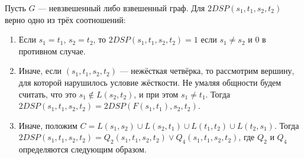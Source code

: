 \begin{theorem} \label{main_theorem}
Пусть $G$ --- невзвешенный либо взвешенный граф. Для $2DSP(s_1, t_1, s_2, t_2)$ верно одно из трёх соотношений:
\begin{enumerate} 
\item Если $s_1 = t_1$, $s_2 = t_2$, то $2DSP(s_1, t_1, s_2, t_2) = 1$ если $s_1 \neq s_2$ и $0$ в противном случае.
\item Иначе, если $(s_1, t_1, s_2, t_2)$ --- нежёсткая четвёрка, то рассмотрим вершину, для которой нарушилось условие жёсткости. Не умаляя общности будем считать, что это $s_1 \notin L(s_2, t_2)$, и при этом $s_1 \neq t_1$. Тогда $2DSP(s_1, t_1, s_2, t_2) = 2DSP(F(s_1, t_1), s_2, t_2)$.
\item Иначе, положим $C = L(s_1, s_2) \cup L(s_2, t_1) \cup L(t_1, t_2) \cup L(t_2, s_1)$. Тогда $2DSP(s_1, t_1, s_2, t_2) = Q_2(s_1, t_1, s_2, t_2) \vee Q_4(s_1, t_1, s_2, t_2)$, где $Q_2$ и $Q_4$ определяются следующим образом.


\end{enumerate}
\end{theorem}
